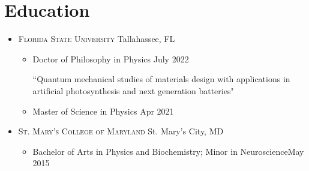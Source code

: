 \section*{Education}

\begin{itemize}[leftmargin=0pt, itemsep = 0pt]
    \item[] { \scshape Florida State University} \hfill Tallahassee, FL
    \begin{itemize}[leftmargin=\firstlistindent, labelsep = 0pt, align=center, labelwidth=\firstlistlabelsep, itemsep = \seclistitemsep, topsep=\seclisttopsepmeta]
        \item[\faUserGraduate] Doctor of Philosophy in Physics \hfill {\color{verygray}July 2022}
        \begin{itemizeSecond}
		   ``Quantum mechanical studies of materials design with applications in artificial photosynthesis and next generation batteries"
		\end{itemizeSecond}

        \item[\faUserGraduate] Master of Science in Physics \hfill {\color{verygray}Apr 2021}
    \end{itemize}

    \item[] { \scshape St. Mary's College of Maryland} \hfill St. Mary's City, MD
    \begin{itemize}[leftmargin=\firstlistindent, labelsep = 0pt, align=center, labelwidth=\firstlistlabelsep, itemsep = \seclistitemsep, topsep=\seclisttopsepmeta]
	\item[\faUserGraduate] Bachelor of Arts in Physics and Biochemistry; Minor in Neuroscience\hfill {\color{verygray}May 2015}
    \end{itemize}
\end{itemize}
